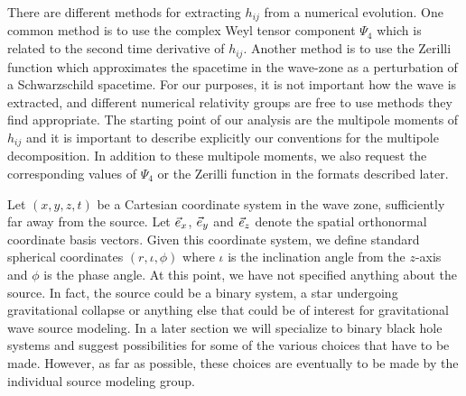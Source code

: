 \documentclass[10pt]{ligodcc}
\begin{document}
There are different methods for extracting $h_{ij}$ from a numerical
evolution.  One common method is to use the complex Weyl tensor
component $\Psi_4$ which is related to the second time derivative of
$h_{ij}$. Another method is to use the Zerilli function which
approximates the spacetime in the wave-zone as a perturbation of a
Schwarzschild spacetime.  For our purposes, it is not important how
the wave is extracted, and different numerical relativity groups are
free to use methods they find appropriate.  The starting point of our
analysis are the multipole moments of $h_{ij}$ and it is important to
describe explicitly our conventions for the multipole decomposition.
In addition to these multipole moments, we also request the
corresponding values of $\Psi_4$ or the Zerilli function in the
formats described later.

Let $(x,y,z,t)$ be a Cartesian coordinate system in the wave zone,
sufficiently far away from the source. Let $\vec{e}_x$, $\vec{e}_y$ and
$\vec{e}_z$ denote the spatial orthonormal coordinate basis vectors.
Given this coordinate system, we define standard spherical coordinates
$(r,\iota,\phi)$ where $\iota$ is the inclination angle from the
$z$-axis and $\phi$ is the phase angle.  At this point, we have not
specified anything about the source.  In fact, the source could be a
binary system, a star undergoing gravitational collapse or anything
else that could be of interest for gravitational wave source modeling.
In a later section we will specialize to binary black hole systems and
suggest possibilities for some of the various choices that have to be
made.  However, as far as possible, these choices are eventually to be
made by the individual source modeling group.
\end{document}
